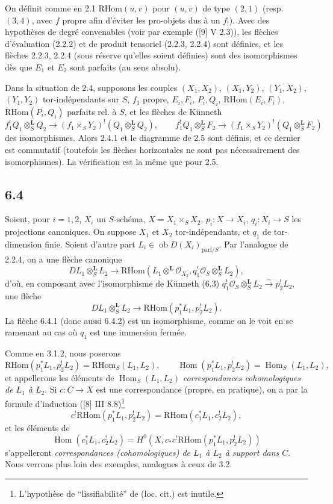 \documentclass[11pt]{article}
\providecommand{\cO}{\mathcal{O}}
\DeclareMathOperator{\Hom}{Hom}
\providecommand{\RHom}{\mathrm{RHom}}
\providecommand{\RHom}{\mathrm{RHom}}
\providecommand{\Hom}{\operatorname{Hom}}
\providecommand{\RHom}{\mathrm R\mathcal{H}om}
\providecommand{\RHom}{\mathrm{RHom}}
\providecommand{\Hom}{\operatorname{Hom}}
\begin{document}
On définit comme en 2.1 $\RHom(u,v)$ pour $(u,v)$ de type $(2,1)$ (resp. $(3,4)$, avec $f$ propre afin d'éviter les pro-objets dus à un $f_!$). Avec des hypothèses de degré convenables (voir par exemple ([9] V 2.3)), les flèches d'évaluation (2.2.2) et de produit tensoriel (2.2.3, 2.2.4) sont définies, et les flèches 2.2.3, 2.2.4 (sous réserve qu'elles soient définies) sont des isomorphismes dès que $E_1$ et $E_2$ sont parfaits (au sens absolu).

Dans la situation de 2.4, supposons les couples $(X_1,X_2)$, $(X_1,Y_2)$, $(Y_1,X_2)$, $(Y_1,Y_2)$ tor-indépendants sur $S$, $f_1$ propre, $E_i,F_i$, $P_i,Q_i$, $\RHom(E_i,F_i)$, $\RHom(P_i,Q_i)$ parfaits rel. à $S$, et les flèches de Künneth
\[
f_1^!Q_1\otimes_S^{\mathbf L}Q_2\to(f_1\times_SY_2)^!(Q_1\otimes_S^{\mathbf L}Q_2),\qquad
f_1^!Q_1\otimes_S^{\mathbf L}F_2\to(f_1\times_SY_2)^!(Q_1\otimes_S^{\mathbf L}F_2)
\]
des isomorphismes. Alors 2.4.1 et le diagramme de 2.5 sont définis, et ce dernier est commutatif (toutefois les flèches horizontales ne sont pas nécessairement des isomorphismes). La vérification est la même que pour 2.5.

\subsection*{6.4}
Soient, pour $i=1,2$, $X_i$ un $S$-schéma, $X=X_1\times_SX_2$, $p_i:X\to X_i$, $q_i:X_i\to S$ les projections canoniques. On suppose $X_1$ et $X_2$ tor-indépendants, et $q_1$ de tor-dimension finie. Soient d'autre part $L_i\in\operatorname{ob}D(X_i)_{\mathrm{parf}/S}$. Par l'analogue de 2.2.4, on a une flèche canonique
\begin{equation}
\tag{6.4.1}
DL_1\otimes_S^{\mathbf L}L_2\longrightarrow \RHom(L_1\otimes^{\mathbf L}\cO_{X_2},q_1^!\cO_S\otimes_S^{\mathbf L}L_2),
\end{equation}
d'où, en composant avec l'isomorphisme de Künneth (6.3) $q_1^!\cO_S\otimes_S^{\mathbf L}L_2\xrightarrow{\sim}p_2^!L_2$, une flèche
\begin{equation}
\tag{6.4.2}
DL_1\otimes_S^{\mathbf L}L_2\longrightarrow\RHom(p_1^*L_1,p_2^!L_2).
\end{equation}
La flèche 6.4.1 (donc aussi 6.4.2) est un isomorphisme, comme on le voit en se ramenant au cas où $q_1$ est une immersion fermée.

Comme en 3.1.2, nous poserons
\begin{equation}
\tag{6.4.3}
\RHom(p_1^*L_1,p_2^!L_2)=\RHom_S(L_1,L_2),\qquad
\Hom(p_1^*L_1,p_2^!L_2)=\Hom_S(L_1,L_2),
\end{equation}
et appellerons les éléments de $\Hom_S(L_1,L_2)$ \emph{correspondances cohomologiques de $L_1$ à $L_2$}. Si $c:C\to X$ est une correspondance (propre, en pratique), on a par la formule d'induction ([8] III 8.8)\footnote{L'hypothèse de ``lissifiabilité'' de (loc. cit.) est inutile.}
\begin{equation}
\tag{6.4.4}
c^!\RHom(p_1^*L_1,p_2^!L_2)=\RHom(c_1^*L_1,c_2^!L_2),
\end{equation}
et les éléments de
\[
\Hom(c_1^*L_1,c_2^!L_2)=H^0(X,c_*c^!\RHom(p_1^*L_1,p_2^!L_2))
\]
s'appelleront \emph{correspondances (cohomologiques) de $L_1$ à $L_2$ à support dans $C$}. Nous verrons plus loin des exemples, analogues à ceux de 3.2.
\end{document}
